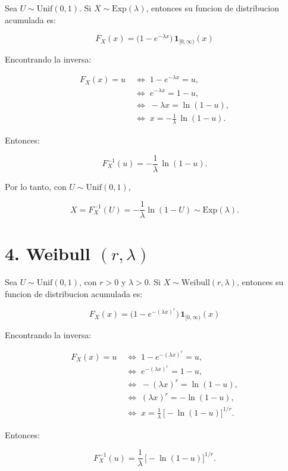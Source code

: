 \documentclass[10pt,a4paper]{article}
\let\oldsection\section
\renewcommand{\section}{%
      \clearpage
      \thispagestyle{myfancy}%
      \oldsection
    }
\begin{document}
    Sea \textbf{\(U\sim\mathrm{Unif}(0,1)\)}. Si
\(X\sim\mathrm{Exp}(\lambda)\), entonces su funcion de distribucion
acumulada es:

\[
F_X(x)=\bigl(1-e^{-\lambda x}\bigr)\,\mathbf{1}_{[0,\infty)}(x)
\]

Encontrando la inversa:

\[
\begin{aligned}
F_X(x)=u &\;\iff\; 1-e^{-\lambda x}=u,\\
         &\;\iff\; e^{-\lambda x}=1-u,\\
         &\;\iff\; -\lambda x=\ln(1-u),\\
         &\;\iff\; x=-\frac{1}{\lambda}\,\ln(1-u).
\end{aligned}
\]

Entonces:

\[
F_X^{-1}(u)=-\frac{1}{\lambda}\,\ln(1-u).
\]

Por lo tanto, con \(U\sim\mathrm{Unif}(0,1)\),

\[
X=F_X^{-1}(U)=-\frac{1}{\lambda}\ln(1-U)\sim\mathrm{Exp}(\lambda).
\]

    \hypertarget{weibull-rlambda}{%
\section{\texorpdfstring{4. Weibull
\((r,\lambda)\)}{4. Weibull (r,\textbackslash lambda)}}\label{weibull-rlambda}}

    Sea \textbf{\(U\sim\mathrm{Unif}(0,1)\)}, con \(r>0\) y \(\lambda>0\).
Si \(X\sim\mathrm{Weibull}(r,\lambda)\), entonces su funcion de
distribucion acumulada es:

\[
F_X(x)=\bigl(1-e^{-(\lambda x)^r}\bigr)\,\mathbf{1}_{[0,\infty)}(x)
\]

Encontrando la inversa:

\[
\begin{aligned}
F_X(x)=u &\;\iff\; 1-e^{-(\lambda x)^r}=u,\\
         &\;\iff\; e^{-(\lambda x)^r}=1-u,\\
         &\;\iff\; -(\lambda x)^r=\ln(1-u),\\
         &\;\iff\; (\lambda x)^r=-\ln(1-u),\\
         &\;\iff\; x=\frac{1}{\lambda}\,\bigl[-\ln(1-u)\bigr]^{1/r}.
\end{aligned}
\]

Entonces:

\[
F_X^{-1}(u)=\frac{1}{\lambda}\,\bigl[-\ln(1-u)\bigr]^{1/r}.
\]
\end{document}
